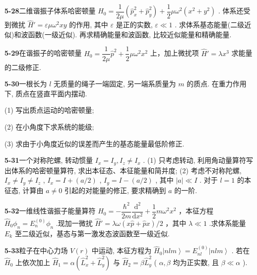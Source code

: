 \vfill

\newpage
\vfill

\noindent
\textbf{5-28}\quad 二维谐振子体系哈密顿量 $\hat{H}_0 = \dfrac{1}{2\mu}\left(\hat{p}_x^2 +\hat{p}_y^2\right) + \dfrac{1}{2}\mu \omega^2\left(x^2 +y^2\right)$ . 体系还受到微扰 $\hat{H}' = \varepsilon \mu \omega^2 xy$ 的作用, 其中 $\varepsilon$ 是正的实数, $\varepsilon \ll 1$ . 求体系基态能量(二级近似)和波函数(一级近似). 再求精确能量和波函数, 比较近似能量和精确能量.

\vfill

\newpage
\vfill

\noindent
\textbf{5-29}\quad 在谐振子的哈密顿量 $\hat{H}_0 = \dfrac{1}{2\mu}\hat{p}^2 +\dfrac{1}{2}\mu \omega^2 x^2$ 上，加上微扰项 $\hat{H}' = \lambda x^3$ 求能量的二级修正.

\vfill

\newpage
\vfill

\noindent
\textbf{5-30}\quad 一根长为 $l$ 无质量的绳子一端固定, 另一端系质量为 $m$ 的质点. 在重力作用下, 质点在竖直平面内摆动. 

(1) 写出质点运动的哈密顿量; 

(2) 在小角度下求系统的能级; 

(3) 求由于小角度近似的误差而产生的基态能量最低阶修正.

\vfill

\newpage
\vfill

\noindent
\textbf{5-31}\quad 一个对称陀螺, 转动惯量 $I_x = I_y, I_z \neq I_x$ . (1) 只考虑转动, 利用角动量算符写出体系的哈密顿量算符, 求出本征态、本征能量和简并度; (2) 考虑不对称陀螺, $I_x \neq I_y \neq I_z$ , $I_x = I + (a/2)$ , $I_y = I - (a/2)$ , 其中 $|a| \ll I$ . 对于 $l = 1$ 的本征态, 计算由 $a \neq 0$ 引起的对能量的修正, 要求精确到 $a$ 的一阶.

\vfill

\newpage
\vfill

\noindent
\textbf{5-32}\quad 一维线性谐振子能量算符 $\hat{H}_0 = -\dfrac{\hbar^2}{2m}\dfrac{\mathrm{d}^2}{\mathrm{d}x^2} +\dfrac{1}{2} m\omega^2 x^2$ ，本征方程 $\hat{H}_0\phi_n = E_n^{(0)}\phi_n$ .现加一微扰 $\hat{H}' = \lambda \omega (x\hat{p} +\hat{p} x) / 2$ ，其中 $\lambda \ll 1$ .求体系能量 $E_{k}$ 至二级近似，基态与第一激发态波函数至一级近似.

\vfill

\newpage
\vfill

\noindent
\textbf{5-33}\quad 粒子在中心力场 $V(r)$ 中运动, 本征方程为 $\hat{H}_0\left|nlm\right\rangle = E_{nl}^{(0)}\left|nlm\right\rangle$ . 若在 $\hat{H}_0$ 上依次加上 $\hat{H}_1 = \alpha (\hat{L}_x^2 + \hat{L}_y^2)$ 与 $\hat{H}_2 = \beta \hat{L}_y^2$ ( $\alpha, \beta$ 均为正实数, 且 $\beta \ll \alpha$ ). 

